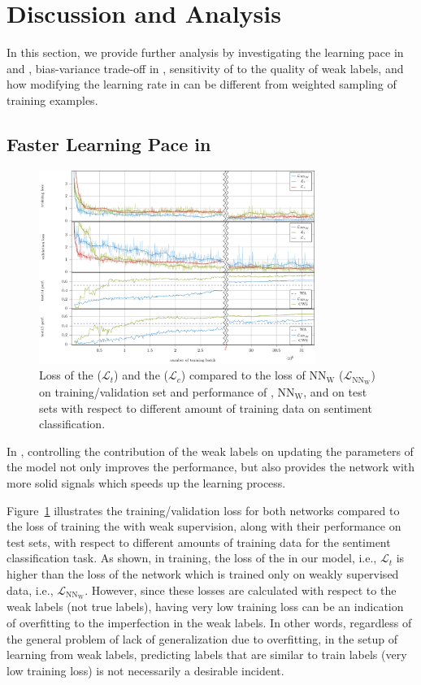\section{Discussion and Analysis}
\label{sec:discussion}
\shrink
In this section, we provide further analysis by investigating the learning pace in \cws and \fwl, bias-variance trade-off in \fwl, sensitivity of \fwl to the quality of weak labels, and how modifying the learning rate in \fwl can be different from weighted sampling of training examples.

\subsection{Faster Learning Pace in \cws}
\label{sec:learning_pace}
\begin{figure}[!t]%
    \centering
    \includegraphics[width=0.8\textwidth]{03-part-02/chapter-05/figs_and_tables/plot_loss_cws.pdf}
    \caption{Loss of the \tnet ($\mathcal{L}_t$) and the \cnet ($\mathcal{L}_c$) compared to the loss of $\text{NN}_{\text{W}}$ ($\mathcal{L}_{\text{NN}_{\text{W}}}$) on training/validation set and performance of \cws, $\text{NN}_{\text{W}}$, and \wa on test sets with respect to different amount of training data on sentiment classification.}
    \label{fig:plot_loss_cws}
\end{figure}
In \cws, controlling the contribution of the weak labels on updating the parameters of the model not only improves the performance, but also provides the network with more solid signals which speeds up the learning process. 

Figure~\ref{fig:plot_loss_cws} illustrates the training/validation loss for both networks compared to the loss of training the \tnet with weak supervision, along with their performance on test sets, with respect to different amounts of training data for the sentiment classification task.
As shown, in training, the loss of the \tnet in our model, i.e., $\mathcal{L}_t$ is higher than the loss of the network which is trained only on weakly supervised data, i.e., $\mathcal{L}_{\text{NN}_{\text{W}}}$. 
%
However, since these losses are calculated with respect to the weak labels (not true labels), having very low training loss can be an indication of overfitting to the imperfection in the weak labels. 
%
In other words, regardless of the general problem of lack of generalization due to overfitting, in the setup of learning from weak labels, predicting labels that are similar to train labels (very low training loss) is not necessarily a desirable incident. 

